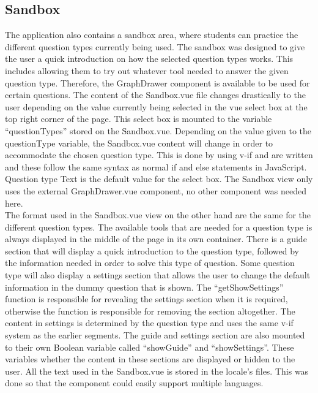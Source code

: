 \subsection{Sandbox}
The application also contains a sandbox area, where students can practice the different question types currently being used. The sandbox was designed to give the user a quick introduction on how the selected question types works. This includes allowing them to try out whatever tool needed to answer the given question type. Therefore, the GraphDrawer component is available to be used for certain questions. The content of the Sandbox.vue file changes drastically to the user depending on the value currently being selected in the vue select box at the top right corner of the page. This select box is mounted to the variable “questionTypes” stored on the Sandbox.vue. Depending on the value given to the questionType variable, the Sandbox.vue content will change in order to accommodate the chosen question type. This is done by using v-if and are written and these follow the same syntax as normal if and else statements in JavaScript. Question type Text is the default value for the select box. The Sandbox view only uses the external GraphDrawer.vue component, no other component was needed here. \\[11pt]
The format used in the Sandbox.vue view on the other hand are the same for the different question types. The available tools that are needed for a question type is always displayed in the middle of the page in its own container. There is a guide section that will display a quick introduction to the question type, followed by the information needed in order to solve this type of question. Some question type will also display a settings section that allows the user to change the default information in the dummy question that is shown. The “getShowSettings” function is responsible for revealing the settings section when it is required, otherwise the function is responsible for removing the section altogether.  The content in settings is determined by the question type and uses the same v-if system as the earlier segments. The guide and settings section are also mounted to their own Boolean variable called “showGuide” and “showSettings”. These variables whether the content in these sections are displayed or hidden to the user. All the text used in the Sandbox.vue is stored in the locale’s files. This was done so that the component could easily support multiple languages. \\[11pt]
